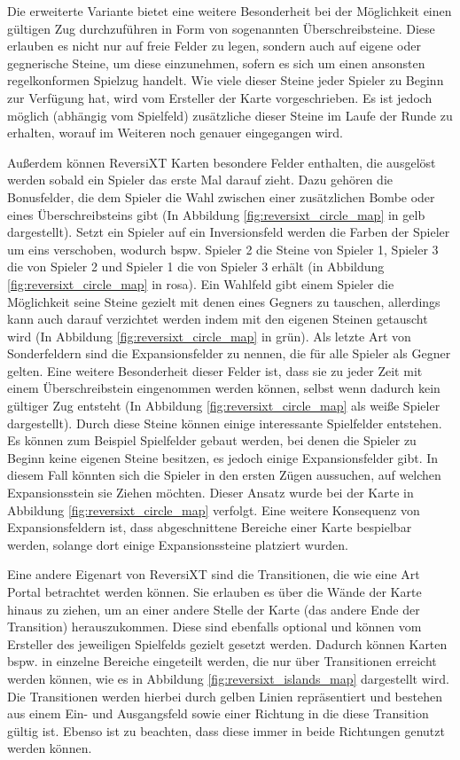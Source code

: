 \documentclass[12pt,a4paper,bibliography=totocnumbered,listof=totocnumbered]{article}
\begin{document}
Die erweiterte Variante bietet eine weitere Besonderheit bei der Möglichkeit einen gültigen Zug durchzuführen in Form von sogenannten Überschreibsteine. Diese erlauben es nicht nur auf freie Felder zu legen, sondern auch auf eigene oder gegnerische Steine, um diese einzunehmen, sofern es sich um einen ansonsten regelkonformen Spielzug handelt. Wie viele dieser Steine jeder Spieler zu Beginn zur Verfügung hat, wird vom Ersteller der Karte vorgeschrieben. Es ist jedoch möglich (abhängig vom Spielfeld) zusätzliche dieser Steine im Laufe der Runde zu erhalten, worauf im Weiteren noch genauer eingegangen wird. 

Außerdem können ReversiXT Karten besondere Felder enthalten, die ausgelöst werden sobald ein Spieler das erste Mal darauf zieht. Dazu gehören die Bonusfelder, die dem Spieler die Wahl zwischen einer zusätzlichen Bombe oder eines Überschreibsteins gibt (In Abbildung \ref{fig:reversixt_circle_map} in gelb dargestellt). Setzt ein Spieler auf ein Inversionsfeld werden die Farben der Spieler um eins verschoben, wodurch bspw. Spieler 2 die Steine von Spieler 1, Spieler 3 die von Spieler 2 und Spieler 1 die von Spieler 3 erhält (in Abbildung \ref{fig:reversixt_circle_map} in rosa). Ein Wahlfeld gibt einem Spieler die Möglichkeit seine Steine gezielt mit denen eines Gegners zu tauschen, allerdings kann auch darauf verzichtet werden indem mit den eigenen Steinen \glqq getauscht\grqq{} wird (In Abbildung \ref{fig:reversixt_circle_map} in grün). Als letzte Art von Sonderfeldern sind die Expansionsfelder zu nennen, die für alle Spieler als Gegner gelten. Eine weitere Besonderheit dieser Felder ist, dass sie zu jeder Zeit mit einem Überschreibstein eingenommen werden können, selbst wenn dadurch kein gültiger Zug entsteht (In Abbildung \ref{fig:reversixt_circle_map} als weiße Spieler dargestellt). Durch diese Steine können einige interessante Spielfelder entstehen. Es können zum Beispiel Spielfelder gebaut werden, bei denen die Spieler zu Beginn keine eigenen Steine besitzen, es jedoch einige Expansionsfelder gibt. In diesem Fall könnten sich die Spieler in den ersten Zügen aussuchen, auf welchen Expansionsstein sie Ziehen möchten. Dieser Ansatz wurde bei der Karte in Abbildung \ref{fig:reversixt_circle_map} verfolgt. Eine weitere Konsequenz von Expansionsfeldern ist, dass abgeschnittene Bereiche einer Karte bespielbar werden, solange dort einige Expansionssteine platziert wurden.

Eine andere Eigenart von ReversiXT sind die Transitionen, die wie eine Art Portal betrachtet werden können. Sie erlauben es über die Wände der Karte hinaus zu ziehen, um an einer andere Stelle der Karte (das andere Ende der Transition) herauszukommen. Diese sind ebenfalls optional und können vom Ersteller des jeweiligen Spielfelds gezielt gesetzt werden. Dadurch können Karten bspw. in einzelne Bereiche eingeteilt werden, die nur über Transitionen erreicht werden können, wie es in Abbildung \ref{fig:reversixt_islands_map} dargestellt wird. Die Transitionen werden hierbei durch gelben Linien repräsentiert und bestehen aus einem Ein- und Ausgangsfeld sowie einer Richtung in die diese Transition gültig ist. Ebenso ist zu beachten, dass diese immer in beide Richtungen genutzt werden können.
\end{document}
